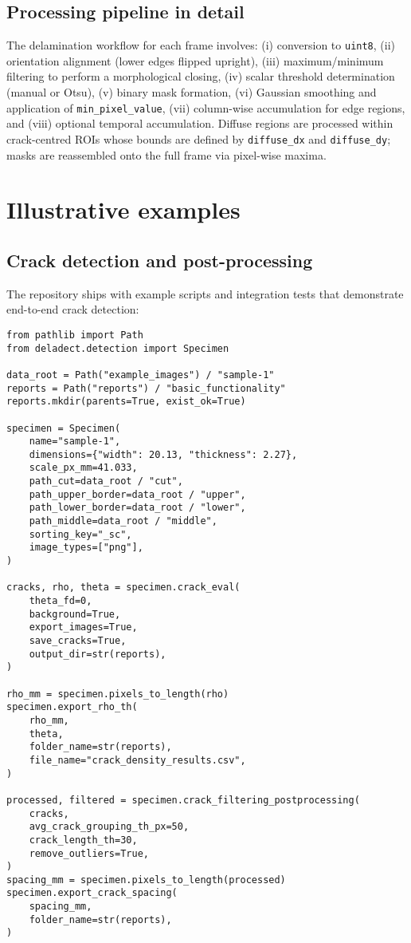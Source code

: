 \documentclass[preprint,12pt,a4paper]{elsarticle}
\begin{document}
\subsection{Processing pipeline in detail}
The delamination workflow for each frame involves: (i) conversion to \texttt{uint8}, (ii) orientation
alignment (lower edges flipped upright), (iii) maximum/minimum filtering to perform a morphological
closing, (iv) scalar threshold determination (manual or Otsu), (v) binary mask formation, (vi) Gaussian
smoothing and application of \texttt{min\_pixel\_value}, (vii) column-wise accumulation for edge regions,
and (viii) optional temporal accumulation. Diffuse regions are processed within crack-centred ROIs whose
bounds are defined by \texttt{diffuse\_dx} and \texttt{diffuse\_dy}; masks are reassembled onto the full
frame via pixel-wise maxima.

\section{Illustrative examples}
\subsection{Crack detection and post-processing}
The repository ships with example scripts and integration tests that demonstrate end-to-end crack
detection:

\begin{verbatim}
from pathlib import Path
from deladect.detection import Specimen

data_root = Path("example_images") / "sample-1"
reports = Path("reports") / "basic_functionality"
reports.mkdir(parents=True, exist_ok=True)

specimen = Specimen(
    name="sample-1",
    dimensions={"width": 20.13, "thickness": 2.27},
    scale_px_mm=41.033,
    path_cut=data_root / "cut",
    path_upper_border=data_root / "upper",
    path_lower_border=data_root / "lower",
    path_middle=data_root / "middle",
    sorting_key="_sc",
    image_types=["png"],
)

cracks, rho, theta = specimen.crack_eval(
    theta_fd=0,
    background=True,
    export_images=True,
    save_cracks=True,
    output_dir=str(reports),
)

rho_mm = specimen.pixels_to_length(rho)
specimen.export_rho_th(
    rho_mm,
    theta,
    folder_name=str(reports),
    file_name="crack_density_results.csv",
)

processed, filtered = specimen.crack_filtering_postprocessing(
    cracks,
    avg_crack_grouping_th_px=50,
    crack_length_th=30,
    remove_outliers=True,
)
spacing_mm = specimen.pixels_to_length(processed)
specimen.export_crack_spacing(
    spacing_mm,
    folder_name=str(reports),
)
\end{verbatim}
\end{document}
